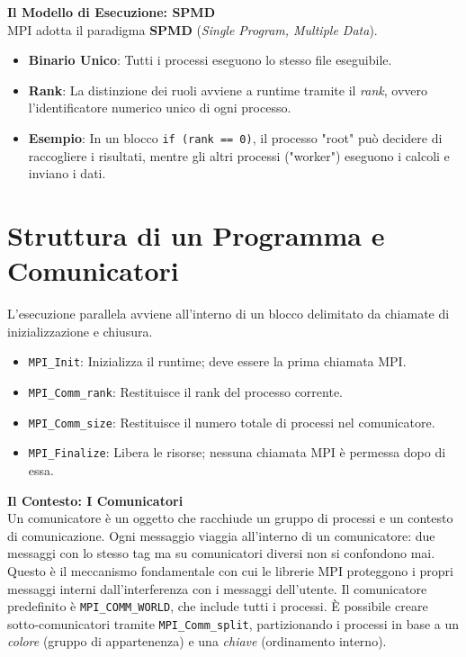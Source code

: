 \begin{framed}
\noindent
\textbf{Il Modello di Esecuzione: SPMD} \\
MPI adotta il paradigma \textbf{SPMD} (\textit{Single Program, Multiple Data}).
\begin{itemize}
    \item \textbf{Binario Unico}: Tutti i processi eseguono lo stesso file eseguibile.
    \item \textbf{Rank}: La distinzione dei ruoli avviene a runtime tramite il \textit{rank}, ovvero l'identificatore numerico unico di ogni processo.
    \item \textbf{Esempio}: In un blocco \texttt{if (rank == 0)}, il processo "root" può decidere di raccogliere i risultati, mentre gli altri processi ("worker") eseguono i calcoli e inviano i dati.
\end{itemize}
\end{framed}

\section{Struttura di un Programma e Comunicatori}
L'esecuzione parallela avviene all'interno di un blocco delimitato da chiamate di inizializzazione e chiusura.
\begin{itemize}
    \item \texttt{MPI\_Init}: Inizializza il runtime; deve essere la prima chiamata MPI.
    \item \texttt{MPI\_Comm\_rank}: Restituisce il rank del processo corrente.
    \item \texttt{MPI\_Comm\_size}: Restituisce il numero totale di processi nel comunicatore.
    \item \texttt{MPI\_Finalize}: Libera le risorse; nessuna chiamata MPI è permessa dopo di essa.
\end{itemize}

\vspace{0.3cm}
\noindent
\textbf{Il Contesto: I Comunicatori} \\
Un comunicatore è un oggetto che racchiude un gruppo di processi e un contesto di comunicazione. Ogni messaggio viaggia all'interno di un comunicatore: due messaggi con lo stesso tag ma su comunicatori diversi non si confondono mai. Questo è il meccanismo fondamentale con cui le librerie MPI proteggono i propri messaggi interni dall'interferenza con i messaggi dell'utente. Il comunicatore predefinito è \texttt{MPI\_COMM\_WORLD}, che include tutti i processi. È possibile creare sotto-comunicatori tramite \texttt{MPI\_Comm\_split}, partizionando i processi in base a un \textit{colore} (gruppo di appartenenza) e una \textit{chiave} (ordinamento interno).

